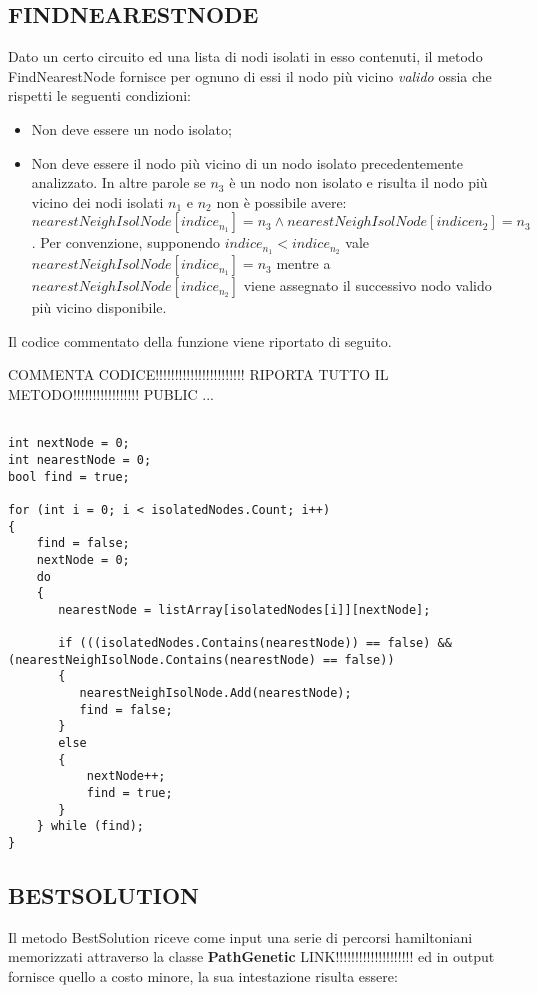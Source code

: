 \documentclass[11pt]{article}
\begin{document}
\subsection*{FINDNEARESTNODE}

Dato un certo circuito ed una lista di nodi isolati in esso contenuti, il metodo FindNearestNode fornisce per ognuno di essi il nodo più vicino \textit{valido} ossia che rispetti le seguenti condizioni:

\begin{itemize}
    \item  Non deve essere un nodo isolato;
    \item  Non deve essere il nodo più vicino di un nodo isolato precedentemente analizzato. In altre parole se $n_3$ è un nodo non isolato e risulta il nodo più vicino dei nodi isolati $n_1$ e $n_2$ non è possibile avere: $nearestNeighIsolNode[indice_{n_1}] = n_3 \wedge nearestNeighIsolNode[indice{n_2}] = n_3$. Per convenzione, supponendo $indice_{n_1} < indice_{n_2}$ vale $nearestNeighIsolNode[indice_{n_1}] = n_3$ mentre a $nearestNeighIsolNode[indice_{n_2}]$ viene assegnato il successivo nodo valido più vicino disponibile.
\end{itemize}

Il codice commentato della funzione viene riportato di seguito.

COMMENTA CODICE!!!!!!!!!!!!!!!!!!!!!!! RIPORTA TUTTO IL METODO!!!!!!!!!!!!!!!!! PUBLIC ...

\begin{lstlisting}

int nextNode = 0;
int nearestNode = 0;
bool find = true;

for (int i = 0; i < isolatedNodes.Count; i++)
{
    find = false;
    nextNode = 0;
    do
    {
       nearestNode = listArray[isolatedNodes[i]][nextNode];

       if (((isolatedNodes.Contains(nearestNode)) == false) && (nearestNeighIsolNode.Contains(nearestNode) == false))
       {
          nearestNeighIsolNode.Add(nearestNode);
          find = false;
       }
       else
       {
           nextNode++;
           find = true;
       }
    } while (find);
}

\end{lstlisting}

\subsection*{BESTSOLUTION}

Il metodo BestSolution riceve come input una serie di percorsi hamiltoniani memorizzati attraverso la classe \textbf{PathGenetic} LINK!!!!!!!!!!!!!!!!!!!! ed in output fornisce quello a costo minore, la sua intestazione risulta essere:
\end{document}
